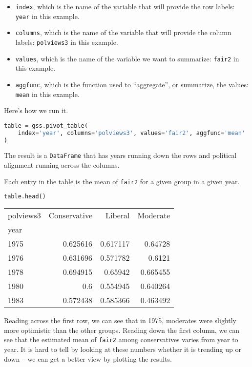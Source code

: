 \begin{itemize}
\item
  \passthrough{\lstinline!index!}, which is the name of the variable
  that will provide the row labels: \passthrough{\lstinline!year!} in
  this example.
\item
  \passthrough{\lstinline!columns!}, which is the name of the variable
  that will provide the column labels:
  \passthrough{\lstinline!polviews3!} in this example.
\item
  \passthrough{\lstinline!values!}, which is the name of the variable we
  want to summarize: \passthrough{\lstinline!fair2!} in this example.
\item
  \passthrough{\lstinline!aggfunc!}, which is the function used to
  ``aggregate'', or summarize, the values:
  \passthrough{\lstinline!mean!} in this example.
\end{itemize}

Here's how we run it.

\begin{lstlisting}[language=Python,style=source]
table = gss.pivot_table(
    index='year', columns='polviews3', values='fair2', aggfunc='mean'
)
\end{lstlisting}

The result is a \passthrough{\lstinline!DataFrame!} that has years
running down the rows and political alignment running across the
columns.

Each entry in the table is the mean of
\passthrough{\lstinline!fair2!} for a given group in a given year.

\begin{lstlisting}[language=Python,style=source]
table.head()
\end{lstlisting}

\begin{tabular}{lrrr}
\toprule
polviews3 & Conservative & Liberal & Moderate \\
year &  &  &  \\
\midrule
1975 & 0.625616 & 0.617117 & 0.64728 \\
1976 & 0.631696 & 0.571782 & 0.6121 \\
1978 & 0.694915 & 0.65942 & 0.665455 \\
1980 & 0.6 & 0.554945 & 0.640264 \\
1983 & 0.572438 & 0.585366 & 0.463492 \\
\bottomrule
\end{tabular}

Reading across the first row, we can see that in 1975, moderates were
slightly more optimistic than the other groups. Reading down the first
column, we can see that the estimated mean of
\passthrough{\lstinline!fair2!} among conservatives varies from year to
year. It is hard to tell by looking at these numbers whether it is
trending up or down -- we can get a better view by plotting the results.

